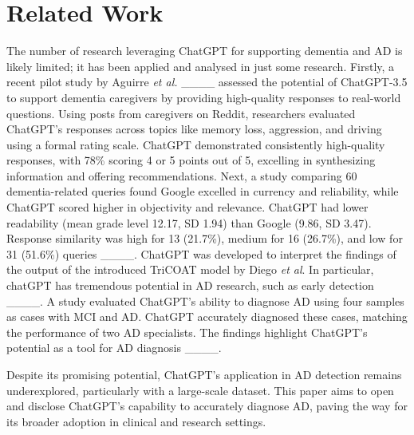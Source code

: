\section{Related Work}
The number of research leveraging ChatGPT for supporting dementia and AD is likely limited; it has been applied and analysed in just some research. Firstly, a recent pilot study by Aguirre \textit{et al.} ____ assessed the potential of ChatGPT-3.5 to support dementia caregivers by providing high-quality responses to real-world questions. Using posts from caregivers on Reddit, researchers evaluated ChatGPT's responses across topics like memory loss, aggression, and driving using a formal rating scale. ChatGPT demonstrated consistently high-quality responses, with 78\% scoring 4 or 5 points out of 5, excelling in synthesizing information and offering recommendations. Next, a study comparing 60 dementia-related queries found Google excelled in currency and reliability, while ChatGPT scored higher in objectivity and relevance. ChatGPT had lower readability (mean grade level 12.17, SD 1.94) than Google (9.86, SD 3.47). Response similarity was high for 13 (21.7\%), medium for 16 (26.7\%), and low for 31 (51.6\%) queries ____. ChatGPT was developed to interpret the findings of the output of the introduced TriCOAT model by Diego \textit{et al}. In particular, chatGPT has tremendous potential in AD research, such as early detection ____. A study evaluated ChatGPT's ability to diagnose AD using four samples as cases with MCI and AD. ChatGPT accurately diagnosed these cases, matching the performance of two AD specialists. The findings highlight ChatGPT’s potential as a tool for AD diagnosis ____.

Despite its promising potential, ChatGPT's application in AD detection remains underexplored, particularly with a large-scale dataset. This paper aims to open and disclose ChatGPT's capability to accurately diagnose AD, paving the way for its broader adoption in clinical and research settings.
